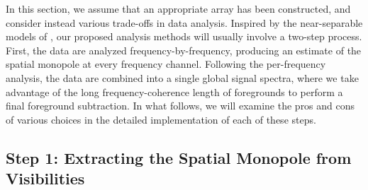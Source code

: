 \documentclass[twolcolumn,apj,iop,numberedappendix]{emulateapj}
\begin{document}
In this section, we assume that an appropriate array has been constructed, and consider instead various trade-offs in data analysis. Inspired by the near-separable models of \citet{Liu_Switzer_2014}, our proposed analysis methods will usually involve a two-step process. First, the data are analyzed frequency-by-frequency, producing an estimate of the spatial monopole at every frequency channel. Following the per-frequency analysis, the data are combined into a single global signal spectra, where we take advantage of the long frequency-coherence length of foregrounds to perform a final foreground subtraction. In what follows, we will examine the pros and cons of various choices in the detailed implementation of each of these steps.

\subsection{Step 1: Extracting the Spatial Monopole from Visibilities}
\end{document}
